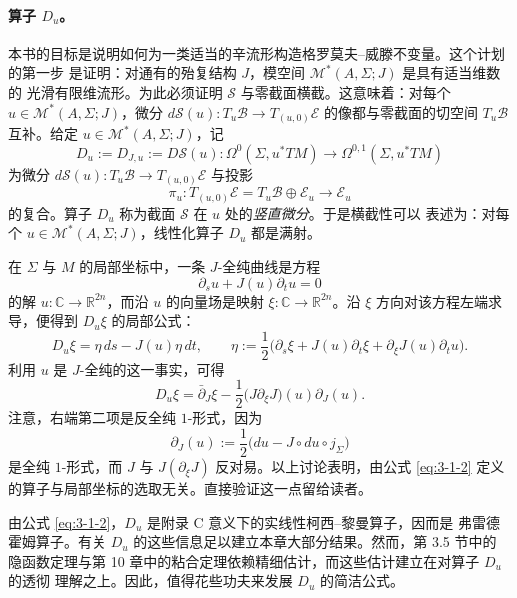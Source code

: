 \paragraph{算子 \texorpdfstring{$D_u$}{Du}。}
本书的目标是说明如何为一类适当的辛流形构造格罗莫夫--威滕不变量。这个计划的第一步
是证明：对通有的殆复结构 $J$，模空间 $\mathcal M^*(A,\Sigma;J)$ 是具有适当维数的
光滑有限维流形。为此必须证明 $\mathcal S$ 与零截面横截。这意味着：对每个
$u\in\mathcal M^*(A,\Sigma;J)$，微分
$d\mathcal S(u):T_u\mathcal B\to T_{(u,0)}\mathcal E$ 的像都与零截面的切空间
$T_u\mathcal B$ 互补。给定 $u\in\mathcal M^*(A,\Sigma;J)$，记
\[
  D_u:=D_{J,u}:=D\mathcal S(u):
  \Omega^0(\Sigma,u^*TM)\longrightarrow\Omega^{0,1}(\Sigma,u^*TM)
\]
为微分 $d\mathcal S(u):T_u\mathcal B\to T_{(u,0)}\mathcal E$ 与投影
\[
  \pi_u:T_{(u,0)}\mathcal E=T_u\mathcal B\oplus\mathcal E_u
  \longrightarrow\mathcal E_u
\]
的复合。算子 $D_u$ 称为截面 $\mathcal S$ 在 $u$ 处的\emph{竖直微分}。于是横截性可以
表述为：对每个 $u\in\mathcal M^*(A,\Sigma;J)$，线性化算子 $D_u$ 都是满射。

在 $\Sigma$ 与 $M$ 的局部坐标中，一条 $J$-全纯曲线是方程
\[
  \partial_su+J(u)\partial_tu=0
\]
的解 $u:\mathbb C\to\mathbb R^{2n}$，而沿 $u$ 的向量场是映射
$\xi:\mathbb C\to\mathbb R^{2n}$。沿 $\xi$ 方向对该方程左端求导，便得到
$D_u\xi$ 的局部公式：
\[
  D_u\xi=\eta\,ds-J(u)\eta\,dt,
  \qquad
  \eta:=\frac12\bigl(\partial_s\xi+J(u)\partial_t\xi
  +\partial_\xi J(u)\partial_tu\bigr).
\]
利用 $u$ 是 $J$-全纯的这一事实，可得
\begin{equation}\label{eq:3-1-2}
  D_u\xi=\bar\partial_J\xi
  -\frac12\bigl(J\partial_\xi J\bigr)(u)\partial_J(u).
\end{equation}
注意，右端第二项是反全纯 $1$-形式，因为
\[
  \partial_J(u):=\frac12\bigl(du-J\circ du\circ j_\Sigma\bigr)
\]
是全纯 $1$-形式，而 $J$ 与 $J(\partial_\xi J)$ 反对易。以上讨论表明，由公式
\eqref{eq:3-1-2} 定义的算子与局部坐标的选取无关。直接验证这一点留给读者。

由公式 \eqref{eq:3-1-2}，$D_u$ 是附录 C 意义下的实线性柯西--黎曼算子，因而是
弗雷德霍姆算子。有关 $D_u$ 的这些信息足以建立本章大部分结果。然而，第 3.5 节中的
隐函数定理与第 10 章中的粘合定理依赖精细估计，而这些估计建立在对算子 $D_u$ 的透彻
理解之上。因此，值得花些功夫来发展 $D_u$ 的简洁公式。

